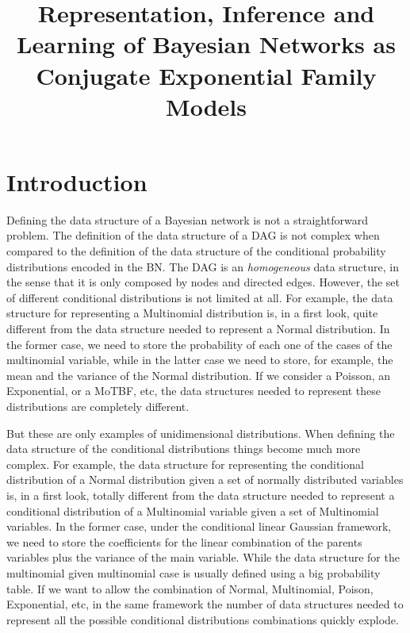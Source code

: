 \documentclass[11pt, oneside]{article}   	%
\numberwithin{figure}{section}
\numberwithin{equation}{section}
\numberwithin{table}{section}
\theoremstyle{definition}
\begin{document}
\title{ Representation, Inference and Learning of Bayesian Networks as Conjugate Exponential Family Models }

\maketitle
\begin{abstract}

\end{abstract}


\section{Introduction}

Defining the data structure of a Bayesian network is not a straightforward problem. The definition of the data structure of a DAG is not complex when compared to the definition of the data structure of the conditional probability distributions encoded in the BN. The DAG is an \textit{homogeneous} data structure, in the sense that it is only composed by nodes and directed edges. However, the set of different conditional distributions is not limited at all. For example, the data structure for representing a Multinomial distribution is, in a first look, quite different from the data structure needed to represent a Normal distribution. In the former case, we need to store the probability of each one of the cases of the multinomial variable, while in the latter case we need to store, for example, the mean and the variance of the Normal distribution. If we consider a Poisson, an Exponential, or a MoTBF, etc, the data structures needed to represent these distributions are completely different. 

But these are only examples of unidimensional distributions. When defining the data structure of the conditional distributions things become much more complex. For example, the data structure for representing the conditional distribution of a Normal distribution given a set of normally distributed variables is, in a first look, totally different from the data structure needed to represent a conditional distribution of a Multinomial variable given a set of Multinomial variables. In the former case, under the conditional linear Gaussian framework, we need to store the coefficients for the linear combination of the parents variables plus the variance of the main variable. While the data structure for the multinomial given multinomial case is usually defined using a big probability table. If we want to allow the combination of Normal, Multinomial, Poison, Exponential, etc, in the same framework the number of data structures needed to represent all the possible conditional distributions combinations quickly explode.
\end{document}
